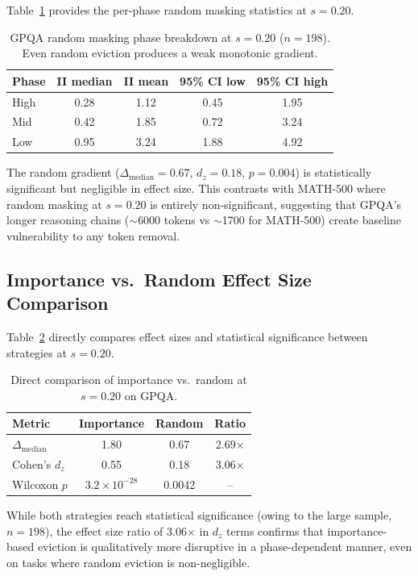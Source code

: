 \documentclass[11pt,a4paper]{article}
\begin{document}
Table~\ref{tab:gpqa_random_phase} provides the per-phase random masking statistics at $s=0.20$.

\begin{table}[h]
\centering
\caption{GPQA random masking phase breakdown at $s=0.20$ ($n=198$). Even random eviction produces a weak monotonic gradient.}
\label{tab:gpqa_random_phase}
\begin{tabular}{lcccc}
\toprule
Phase & II median & II mean & 95\% CI low & 95\% CI high \\
\midrule
High & 0.28 & 1.12 & 0.45 & 1.95 \\
Mid & 0.42 & 1.85 & 0.72 & 3.24 \\
Low & 0.95 & 3.24 & 1.88 & 4.92 \\
\bottomrule
\end{tabular}
\end{table}

The random gradient ($\Delta_{\text{median}} = 0.67$, $d_z = 0.18$, $p = 0.004$) is statistically significant but negligible in effect size. This contrasts with MATH-500 where random masking at $s=0.20$ is entirely non-significant, suggesting that GPQA's longer reasoning chains ($\sim$6000 tokens vs $\sim$1700 for MATH-500) create baseline vulnerability to any token removal.

\subsection{Importance vs.\ Random Effect Size Comparison}

Table~\ref{tab:effect_size_comparison} directly compares effect sizes and statistical significance between strategies at $s=0.20$.

\begin{table}[h]
\centering
\caption{Direct comparison of importance vs.\ random at $s=0.20$ on GPQA.}
\label{tab:effect_size_comparison}
\begin{tabular}{lccc}
\toprule
Metric & Importance & Random & Ratio \\
\midrule
$\Delta_{\text{median}}$ & 1.80 & 0.67 & 2.69$\times$ \\
Cohen's $d_z$ & 0.55 & 0.18 & 3.06$\times$ \\
Wilcoxon $p$ & $3.2 \times 10^{-28}$ & 0.0042 & -- \\
\bottomrule
\end{tabular}
\end{table}

While both strategies reach statistical significance (owing to the large sample, $n=198$), the effect size ratio of 3.06$\times$ in $d_z$ terms confirms that importance-based eviction is qualitatively more disruptive in a phase-dependent manner, even on tasks where random eviction is non-negligible.
\end{document}
